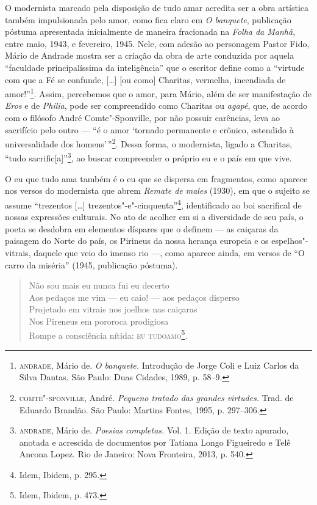O modernista marcado pela disposição de tudo amar acredita ser a obra
artística também impulsionada pelo amor, como fica claro em \emph{O
banquete}, publicação póstuma apresentada inicialmente de maneira
fracionada na \emph{Folha da Manhã}, entre maio, 1943, e fevereiro,
1945. Nele, com adesão ao personagem Pastor Fido, Mário de Andrade
mostra ser a criação da obra de arte conduzida por aquela ``faculdade
principalíssima da inteligência'' que o escritor define como a ``virtude
com que a Fé se confunde, {[}\ldots{}{]} {[}ou como{]} Charitas, vermelha,
incendiada de amor!''\footnote{\textsc{andrade}, Mário de. \emph{O banquete.}
  Introdução de Jorge Coli e Luiz Carlos da Silva Dantas. São Paulo:
  Duas Cidades, 1989, p. 58--9.}. Assim, percebemos que o amor, para
Mário, além de ser manifestação de \emph{Eros} e de \emph{Philia}, pode
ser compreendido como Charitas ou \emph{agapé}, que, de acordo com o
filósofo André Comte"-Sponville, por não possuir carências, leva ao
sacrifício pelo outro --- ``é o amor `tornado permanente e crônico,
estendido à universalidade dos homens'\,''\footnote{\textsc{comte"-sponville},
  André. \emph{Pequeno tratado das grandes virtudes.} Trad. de Eduardo
  Brandão. São Paulo: Martins Fontes, 1995, p. 297--306.}. Dessa forma, o
modernista, ligado a Charitas, ``tudo sacrific{[}a{]}''\footnote{\textsc{andrade},
  Mário de. \emph{Poesias completas.} Vol. 1. Edição de texto apurado,
  anotada e acrescida de documentos por Tatiana Longo Figueiredo e Telê
  Ancona Lopez. Rio de Janeiro: Nova Fronteira, 2013, p. 540.}, ao
buscar compreender o próprio eu e o país em que vive.

O eu que tudo ama também é o eu que se dispersa em fragmentos, como
aparece nos versos do modernista que abrem \emph{Remate de males}
(1930), em que o sujeito se assume ``trezentos {[}\ldots{}{]}
trezentos"-e"-cinquenta''\footnote{Idem, Ibidem, p. 295.}, identificado ao
boi sacrifical de nossas expressões culturais. No ato de acolher em si a
diversidade de seu país, o poeta se desdobra em elementos díspares que o
definem --- as caiçaras da paisagem do Norte do país, os Pirineus da
nossa herança europeia e os espelhos"-vitrais, daquele que veio do imenso
rio ---, como aparece ainda, em versos de ``O carro da miséria'' (1945,
publicação póstuma).

\medskip

\begin{verse}
Não sou mais eu nunca fui eu decerto\\
Aos pedaços me vim --- eu caio! --- aos pedaços disperso\\
Projetado em vitrais nos joelhos nas caiçaras\\
Nos Pireneus em pororoca prodigiosa\\
Rompe a consciência nítida: \textsc{eu tudoamo}\footnote{Idem, Ibidem, p. 473.}.
\end{verse}

